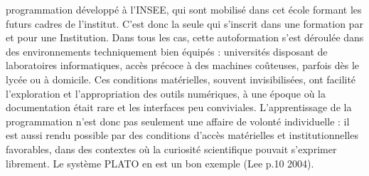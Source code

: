 programmation développé à l’INSEE, qui sont mobilisé dans cet école formant les futurs cadres de l’institut. C'est donc la seule qui s'inscrit dans une formation par et pour une Institution. Dans tous les cas, cette autoformation s’est déroulée dans des environnements techniquement bien équipés : universités disposant de laboratoires informatiques, accès précoce à des machines coûteuses, parfois dès le lycée ou à domicile. Ces conditions matérielles, souvent invisibilisées, ont facilité l’exploration et l’appropriation des outils numériques, à une époque où la documentation était rare et les interfaces peu conviviales. L’apprentissage de la programmation n’est donc pas seulement une affaire de volonté individuelle : il est aussi rendu possible par des conditions d’accès matérielles et institutionnelles favorables, dans des contextes où la curiosité scientifique pouvait s’exprimer librement. Le système PLATO en est un bon exemple (Lee p.10 2004\cite{leeHistoryComputingEducation2004}).


